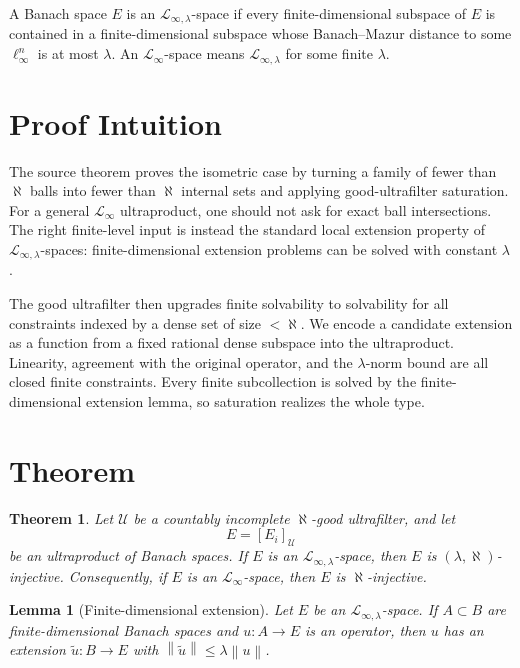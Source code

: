 \documentclass[11pt]{article}
\newtheorem{theorem}{Theorem}
\newtheorem{lemma}{Lemma}
\newcommand{\U}{\mathcal U}
\newcommand{\norm}[1]{\left\lVert #1 \right\rVert}
\begin{document}
A Banach space \(E\) is an \(\mathcal L_{\infty,\lambda}\)-space if every
finite-dimensional subspace of \(E\) is contained in a finite-dimensional
subspace whose Banach--Mazur distance to some \(\ell_\infty^n\) is at most
\(\lambda\).  An \(\mathcal L_\infty\)-space means
\(\mathcal L_{\infty,\lambda}\) for some finite \(\lambda\).

\section*{Proof Intuition}

The source theorem proves the isometric case by turning a family of fewer than
\(\aleph\) balls into fewer than \(\aleph\) internal sets and applying
good-ultrafilter saturation.  For a general \(\mathcal L_\infty\) ultraproduct,
one should not ask for exact ball intersections.  The right finite-level
input is instead the standard local extension property of
\(\mathcal L_{\infty,\lambda}\)-spaces: finite-dimensional extension problems
can be solved with constant \(\lambda\).

The good ultrafilter then upgrades finite solvability to solvability for all
constraints indexed by a dense set of size \(<\aleph\).  We encode a candidate
extension as a function from a fixed rational dense subspace into the
ultraproduct.  Linearity, agreement with the original operator, and the
\(\lambda\)-norm bound are all closed finite constraints.  Every finite
subcollection is solved by the finite-dimensional extension lemma, so
saturation realizes the whole type.

\section*{Theorem}

\begin{theorem}
Let \(\U\) be a countably incomplete \(\aleph\)-good ultrafilter, and let
\[
  E=[E_i]_{\U}
\]
be an ultraproduct of Banach spaces.  If \(E\) is an
\(\mathcal L_{\infty,\lambda}\)-space, then \(E\) is
\((\lambda,\aleph)\)-injective.  Consequently, if \(E\) is an
\(\mathcal L_\infty\)-space, then \(E\) is \(\aleph\)-injective.
\end{theorem}

\begin{lemma}[Finite-dimensional extension]\label{lem:finite}
Let \(E\) be an \(\mathcal L_{\infty,\lambda}\)-space.  If
\(A\subset B\) are finite-dimensional Banach spaces and \(u:A\to E\) is an
operator, then \(u\) has an extension \(\widetilde u:B\to E\) with
\(\norm{\widetilde u}\le \lambda\norm u\).
\end{lemma}
\end{document}
